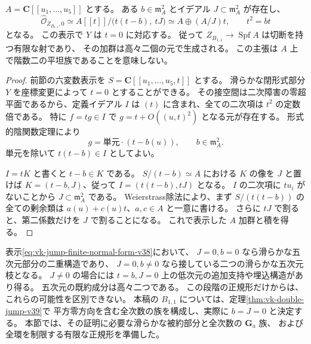 \begin{proposition}[対称性保持部分の有限な正規形]
\label{prop:vk-jump-finite-normal-form-v38}
$A=\mathbf C[[u_1,\ldots,u_5]]$ とする。
ある $b\in\mathfrak m_A^2$ とイデアル $J\subset\mathfrak m_A^2$ が存在し、
\begin{equation}
 \widehat{\mathcal O}_{Z_{B_{1,1}},0}
 \simeq A[[t]]/\bigl(t(t-b),\ tJ\bigr)
 \simeq A\oplus(A/J)t,\qquad t^2=bt
 \label{eq:vk-jump-finite-normal-form-v38}
\end{equation}
となる。
この表示で $Y$ は $t=0$ に対応する。
従って $Z_{B_{1,1}}\to\operatorname{Spf}A$ は切断を持つ有限な射であり、
その加群は高々二個の元で生成される。
この主張は $A$ 上で階数二の平坦族であることを意味しない。
\end{proposition}

\begin{proof}
前節の六変数表示を $S=\mathbf C[[u_1,\ldots,u_5,t]]$ とする。
滑らかな閉形式部分 $Y$ を座標変更によって $t=0$ とすることができる。
その接空間は二次障害の零超平面であるから、定義イデアル $I$ は
$(t)$ に含まれ、全ての二次項は $t^2$ の定数倍である。
特に $f=tg\in I$ で $g=t+O((u,t)^2)$ となる元が存在する。
形式的陰関数定理により
\[
 g=\text{単元}\cdot(t-b(u)),\qquad b\in\mathfrak m_A^2.
\]
単元を除いて $t(t-b)\in I$ としてよい。

$I=tK$ と書くと $t-b\in K$ である。
$S/(t-b)\simeq A$ における $K$ の像を $J$ と置けば
$K=(t-b,J)$、従って $I=(t(t-b),tJ)$ となる。
$I$ の二次項に $tu_i$ がないことから $J\subset\mathfrak m_A^2$ である。
Weierstrass除法により、まず $S/(t(t-b))$ の全ての剰余類は
$a(u)+c(u)t$、$a,c\in A$ と一意に書ける。
さらに $tJ$ で割ると、第二係数だけを $J$ で割ることになる。
これで表示した $A$ 加群と積を得る。
\end{proof}

表示\eqref{eq:vk-jump-finite-normal-form-v38}において、
$J=0,b=0$ なら滑らかな五次元部分の二重構造であり、
$J=0,b\ne0$ なら接している二つの滑らかな五次元枝となる。
$J\ne0$ の場合には $t=b, J=0$ 上の低次元の追加支持や埋込構造があり得る。
五次元の既約成分は高々二つである。
この段階の正規形だけからは、これらの可能性を区別できない。
本稿の $B_{1,1}$ については、定理\ref{thm:vk-double-jump-v39}で
平方零方向を含む全次数の族を構成し、実際に $b=J=0$ と決定する。
本節では、その証明に必要な滑らかな被約部分と全次数の $\mathbf G_a$ 族、
および全環を制限する有限な正規形を準備した。
